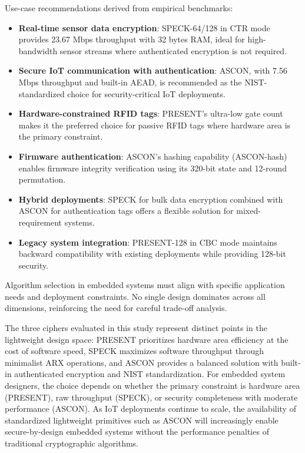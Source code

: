 \documentclass[12pt]{report}
\begin{document}
Use-case recommendations derived from empirical benchmarks:

\begin{itemize}
    \item \textbf{Real-time sensor data encryption}: SPECK-64/128 in CTR mode provides
          23.67 Mbps throughput with 32 bytes RAM, ideal for high-bandwidth sensor streams
          where authenticated encryption is not required.
    \item \textbf{Secure IoT communication with authentication}: ASCON, with 7.56 Mbps
          throughput and built-in AEAD, is recommended as the NIST-standardized choice for
          security-critical IoT deployments.
    \item \textbf{Hardware-constrained RFID tags}: PRESENT's ultra-low gate count makes it
           the preferred choice for passive RFID tags where hardware area is the primary
           constraint.
    \item \textbf{Firmware authentication}: ASCON's hashing capability (ASCON-hash) enables
           firmware integrity verification using its 320-bit state and 12-round permutation.
    \item \textbf{Hybrid deployments}: SPECK for bulk data encryption combined with ASCON
           for authentication tags offers a flexible solution for mixed-requirement systems.
    \item \textbf{Legacy system integration}: PRESENT-128 in CBC mode maintains backward
           compatibility with existing deployments while providing 128-bit security.
\end{itemize}

Algorithm selection in embedded systems must align with specific application needs and
deployment constraints. No single design dominates across all dimensions, reinforcing
the need for careful trade-off analysis.

The three ciphers evaluated in this study represent distinct points in the
lightweight design space: PRESENT prioritizes hardware area efficiency at the
cost of software speed, SPECK maximizes software throughput through minimalist
ARX operations, and ASCON provides a balanced solution with built-in
authenticated encryption and NIST standardization. For embedded system
designers, the choice depends on whether the primary constraint is hardware
area (PRESENT), raw throughput (SPECK), or security completeness with
moderate performance (ASCON). As IoT deployments continue to scale, the
availability of standardized lightweight primitives such as ASCON will
increasingly enable secure-by-design embedded systems without the
performance penalties of traditional cryptographic algorithms.
\end{document}
